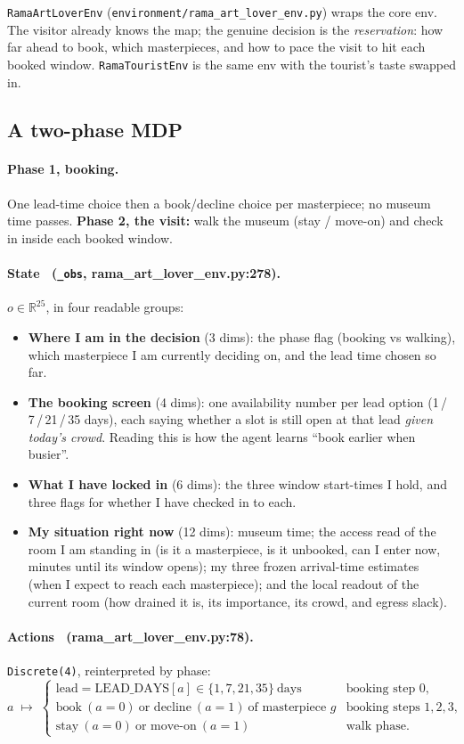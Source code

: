 \documentclass[11pt]{article}
\newcommand{\file}[1]{\texttt{\small #1}}
\newcommand{\co}[1]{\texttt{\small #1}}
\newcommand{\R}{\mathbb{R}}
\begin{document}
\file{RamaArtLoverEnv} (\file{environment/rama\_art\_lover\_env.py}) wraps the core env.
The visitor already knows the map; the genuine decision is the \emph{reservation}: how
far ahead to book, which masterpieces, and how to pace the visit to hit each booked
window. \file{RamaTouristEnv} is the same env with the tourist's taste swapped in.

\subsection{A two-phase MDP}

\paragraph{Phase 1, booking.} One lead-time choice then a book/decline choice per
masterpiece; no museum time passes. \textbf{Phase 2, the visit:} walk the museum (stay /
move-on) and check in inside each booked window.

\paragraph{State \ (\file{\_obs}, rama\_art\_lover\_env.py:278).} $o\in\R^{25}$, in four
readable groups:
\begin{itemize}
\item \textbf{Where I am in the decision} (3 dims): the phase flag (booking vs walking), which masterpiece I am currently deciding on, and the lead time chosen so far.
\item \textbf{The booking screen} (4 dims): one availability number per lead option (1\,/\,7\,/\,21\,/\,35 days), each saying whether a slot is still open at that lead \emph{given today's crowd}. Reading this is how the agent learns ``book earlier when busier''.
\item \textbf{What I have locked in} (6 dims): the three window start-times I hold, and three flags for whether I have checked in to each.
\item \textbf{My situation right now} (12 dims): museum time; the access read of the room I am standing in (is it a masterpiece, is it unbooked, can I enter now, minutes until its window opens); my three frozen arrival-time estimates (when I expect to reach each masterpiece); and the local readout of the current room (how drained it is, its importance, its crowd, and egress slack).
\end{itemize}

\paragraph{Actions \ (rama\_art\_lover\_env.py:78).} \co{Discrete(4)}, reinterpreted by phase:
\[
a\;\mapsto\;\begin{cases}
\text{lead}=\text{LEAD\_DAYS}[a]\in\{1,7,21,35\}\ \text{days} & \text{booking step }0,\\[2pt]
\text{book}\ (a{=}0)\ \text{or decline}\ (a{=}1)\ \text{of masterpiece }g & \text{booking steps }1,2,3,\\[2pt]
\text{stay}\ (a{=}0)\ \text{or move-on}\ (a{=}1) & \text{walk phase.}
\end{cases}
\]
\end{document}

